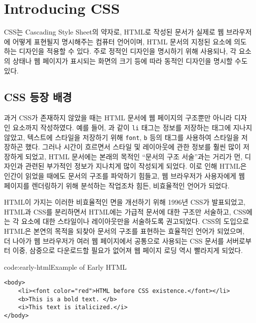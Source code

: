 \section{Introducing CSS} \label{sect:introducing-css}

CSS는 Cascading Style Sheet의 약자로, HTML로 작성된 문서가 실제로 웹 브라우저에 어떻게 표현될지 명시해주는 컴퓨터 언어이며, HTML 문서의 지정된 요소에 의도하는 디자인을 적용할 수 있다. 주로 정적인 디자인을 명시하기 위해 사용되나, 각 요소의 상태나 웹 페이지가 표시되는 화면의 크기 등에 따라 동적인 디자인을 명시할 수도 있다.

\subsection*{CSS 등장 배경}
과거 CSS가 존재하지 않았을 때는 HTML 문서에 웹 페이지의 구조뿐만 아니라 디자인 요소까지 작성하였다. 예를 들어, 과 같이 \texttt{li} 태그는 정보를 저장하는 태그에 지나지 않았고, 텍스트에 스타일을 저장하기 위해 \texttt{font}, \texttt{b} 등의 태그를 사용하여 스타일을 저장하곤 했다. 그러나 시간이 흐르면서 스타일 및 레이아웃에 관한 정보를 훨씬 많이 저장하게 되었고, HTML 문서에는 본래의 목적인 ``문서의 구조 서술''과는 거리가 먼, 디자인과 관련된 부가적인 정보가 지나치게 많이 작성되게 되었다. 이로 인해 HTML은 인간이 읽었을 때에도 문서의 구조를 파악하기 힘들고, 웹 브라우저가 사용자에게 웹 페이지를 렌더링하기 위해 분석하는 작업조차 힘든, 비효율적인 언어가 되었다. 

HTML이 가지는 이러한 비효율적인 면을 개선하기 위해 1996년 CSS가 발표되었고, HTML과 CSS를 분리하면서 HTML에는 가급적 문서에 대한 구조만 서술하고, CSS에는 각 요소에 대한 스타일이나 레이아웃만을 서술하도록 권고되었다. CSS의 도입으로 HTML은 본연의 목적을 되찾아 문서의 구조를 표현하는 효율적인 언어가 되었으며, 더 나아가 웹 브라우저가 여러 웹 페이지에서 공통으로 사용되는 CSS 문서를 서버로부터 이중, 삼중으로 다운로드할 필요가 없어져 웹 페이지 로딩 역시 빨라지게 되었다.

\begin{codeenv}{code:early-html}{Example of Early HTML}\begin{verbatim}
<body>
    <li><font color="red">HTML before CSS existence.</font></li>
    <b>This is a bold text. </b>
    <i>This text is italicized.</i>
</body>
\end{verbatim}
\end{codeenv}
